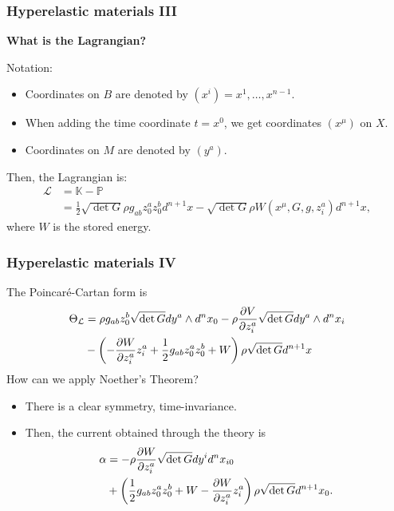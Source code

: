 \begin{frame}
    \frametitle{Hyperelastic materials III}
    \begin{center}
        {\large \bf What is the \alert{Lagrangian}?}
    \end{center}
    \alert{Notation}:
    \begin{itemize}
        \item Coordinates on $B$ are denoted by $(x^i) = x^1, \dots, x^{n-1}.$
        \item When adding the time coordinate $t = x^0$, we get coordinates $(x^\mu)$ on $X$.
        \item Coordinates on $M$ are denoted by $(y^a)$.
    \end{itemize}
    Then, the \alert{Lagrangian} is:
    \begin{align*}
        \mathcal{L} &= \mathbb{K} - \mathbb{P}\\
        &= \frac{1}{2} \sqrt{\det G} \rho g_{ab} z^a_0 z^b_0 d^{n+1}x
        - \sqrt{\det G}\rho W(x^\mu, G, g, z^a_i) d^{n+1}x,
    \end{align*}
    where $W$ is the stored energy.
\end{frame}

\begin{frame}
    \frametitle{Hyperelastic materials IV}
    The \alert{Poincaré-Cartan} form is 
    \begin{align*}
        \Theta_\mathcal{L} &= \rho g_{ab}z^b_0 \sqrt{\det G} dy^a \wedge d^n x_0 - \rho \pdv{V}{z^a_i} \sqrt{\det G} dy^a \wedge d^nx_i\\
        & - \left(-\pdv{W}{z^a_i} z^a_i + \frac{1}{2} g_{ab}z^a_0z^b_0 + W\right) \rho \sqrt{\det G} d^{n+1}x
    \end{align*}
    How can we apply Noether's Theorem?
    \begin{itemize}
        \item There is a clear symmetry, \alert{time-invariance}.
        \item Then, the current obtained through the theory is
        \begin{align*}
            \alpha &= -\rho \pdv{W}{z^a_i} \sqrt{\det G} dy^i d^n x_{i0}\\
             &+ \left(\frac{1}{2}g_{ab}z^a_0z^b_0  + W - \pdv{W}{z^a_i} z^a_i\right) \rho \sqrt{\det G} d^{n+1} x_0.
        \end{align*}
    \end{itemize}
\end{frame}

